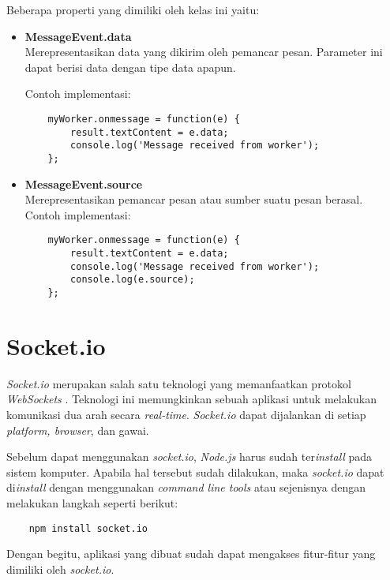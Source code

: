 Beberapa properti yang dimiliki oleh kelas ini yaitu: 

\begin{itemize}
	\item \textbf{MessageEvent.data} \\ Merepresentasikan data yang dikirim oleh pemancar pesan. Parameter ini dapat berisi data dengan tipe data apapun. 
	
	Contoh implementasi:
	\begin{lstlisting}
	myWorker.onmessage = function(e) {
		result.textContent = e.data;
		console.log('Message received from worker');
	};
	\end{lstlisting}
	
	
	\item \textbf{MessageEvent.source} \\ Merepresentasikan pemancar pesan atau sumber suatu pesan berasal. \\
	Contoh implementasi:
	\begin{lstlisting}
	myWorker.onmessage = function(e) {
		result.textContent = e.data;
		console.log('Message received from worker');
		console.log(e.source);
	};
	\end{lstlisting}
\end{itemize}


\section{Socket.io}
\label{sec:Socket.io}

\textit{Socket.io} merupakan salah satu teknologi yang memanfaatkan protokol \textit{WebSockets} \cite{socketio}. Teknologi ini memungkinkan sebuah aplikasi untuk melakukan komunikasi dua arah secara \textit{real-time}. \textit{Socket.io} dapat dijalankan di setiap \textit{platform, browser}, dan gawai.

Sebelum dapat menggunakan \textit{socket.io}, \textit{Node.js} harus sudah ter\textit{install} pada sistem komputer. Apabila hal tersebut sudah dilakukan, maka \textit{socket.io} dapat di\textit{install} dengan menggunakan \textit{command line tools} atau sejenisnya dengan melakukan langkah seperti berikut:
\begin{lstlisting}
	npm install socket.io
\end{lstlisting}

Dengan begitu, aplikasi yang dibuat sudah dapat mengakses fitur-fitur yang dimiliki oleh \textit{socket.io}.

